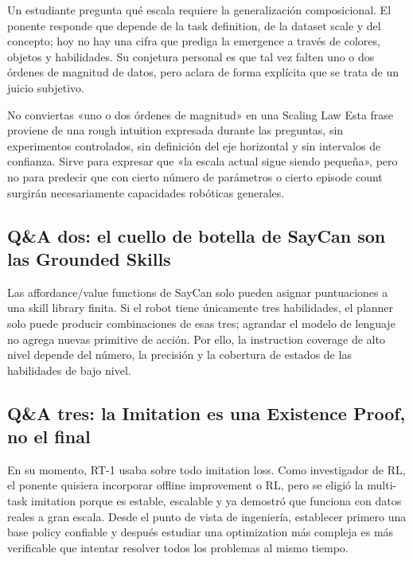 \documentclass[a4paper]{article}
\begin{document}
Un estudiante pregunta qué escala requiere la generalización composicional. El ponente responde que depende de la task definition, de la dataset scale y del concepto; hoy no hay una cifra que prediga la emergence a través de colores, objetos y habilidades. Su conjetura personal es que tal vez falten uno o dos órdenes de magnitud de datos, pero aclara de forma explícita que se trata de un juicio subjetivo.

\begin{warningbox}{No conviertas «uno o dos órdenes de magnitud» en una Scaling Law}
Esta frase proviene de una rough intuition expresada durante las preguntas, sin experimentos controlados, sin definición del eje horizontal y sin intervalos de confianza. Sirve para expresar que «la escala actual sigue siendo pequeña», pero no para predecir que con cierto número de parámetros o cierto episode count surgirán necesariamente capacidades robóticas generales.
\end{warningbox}

\subsection{Q\&A dos: el cuello de botella de SayCan son las Grounded Skills}

Las affordance/value functions de SayCan solo pueden asignar puntuaciones a una skill library finita. Si el robot tiene únicamente tres habilidades, el planner solo puede producir combinaciones de esas tres; agrandar el modelo de lenguaje no agrega nuevas primitive de acción. Por ello, la instruction coverage de alto nivel depende del número, la precisión y la cobertura de estados de las habilidades de bajo nivel.


\subsection{Q\&A tres: la Imitation es una Existence Proof, no el final}

En su momento, RT-1 usaba sobre todo imitation loss. Como investigador de RL, el ponente quisiera incorporar offline improvement o RL, pero se eligió la multi-task imitation porque es estable, escalable y ya demostró que funciona con datos reales a gran escala. Desde el punto de vista de ingeniería, establecer primero una base policy confiable y después estudiar una optimization más compleja es más verificable que intentar resolver todos los problemas al mismo tiempo.
\end{document}
